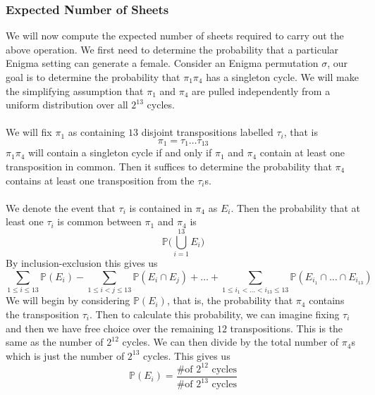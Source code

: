 \subsubsection{Expected Number of Sheets}
We will now compute the expected number of sheets required to carry
out the above operation. We first need to determine the probability
that a particular Enigma setting can generate a female. Consider an
Enigma permutation $\sigma$, our goal is to determine the probability
that $\pi_1\pi_4$ has a singleton cycle. We will make the
simplifying assumption that $\pi_1$ and $\pi_4$ are pulled
independently from a uniform distribution over all $2^{13}$ cycles.
\\\\We will fix $\pi_1$ as containing $13$ disjoint transpositions
labelled $\tau_i$, that is
\[
  \pi_1 = \tau_1\dots\tau_{13}
\]
$\pi_1\pi_4$ will contain a singleton cycle if and only if
$\pi_1$ and $\pi_4$ contain at least one transposition in
common. Then it suffices to determine the probability that $\pi_4$
contains at least one transposition from the $\tau_i$s.
\\\\We denote the event that $\tau_i$ is contained in $\pi_4$ as
$E_i$. Then the probability that at least one $\tau_i$ is common
between $\pi_1$ and $\pi_4$ is
\[
  \mathbb{P}\biggl(\bigcup_{i=1}^{13}E_i\biggr)
\]
By inclusion-exclusion this gives us
\[
  \sum_{1 \le i \le 13}\mathbb{P}(E_i) - \sum_{1\le i < j \le
  13}\mathbb{P}(E_i\cap E_j) + \dots + \sum_{1\le i_1 < \dots <
  i_{13} \le 13}\mathbb{P}(E_{i_1}\cap\dots\cap E_{i_{13}})
\]
We will begin by considering $\mathbb{P}(E_i)$, that is, the
probability that $\pi_4$ contains the transposition $\tau_i$. Then
to calculate this probability, we can imagine fixing $\tau_i$ and
then we have free choice over the remaining $12$ transpositions. This
is the same as the number of $2^{12}$ cycles. We can then divide by
the total number of $\pi_4$s which is just the number of $2^{13}$
cycles. This gives us
\[
  \mathbb{P}(E_i) = \frac{\text{\# of }2^{12}\text{ cycles}}{\text{\#
  of }2^{13}\text{ cycles}}
\]
